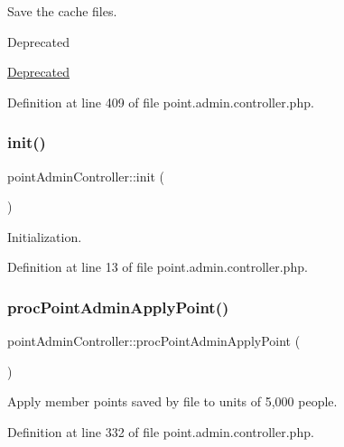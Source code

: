 Save the cache files. 

\begin{DoxyRefDesc}{Deprecated}
\item[\hyperlink{deprecated__deprecated000027}{Deprecated}]\end{DoxyRefDesc}


Definition at line 409 of file point.\+admin.\+controller.\+php.

\mbox{\label{classpointAdminController_a739b139aeeef70cf164f5e21dccec06a}} 
\subsubsection{\texorpdfstring{init()}{init()}}
{\footnotesize\ttfamily point\+Admin\+Controller\+::init (\begin{DoxyParamCaption}{ }\end{DoxyParamCaption})}



Initialization. 



Definition at line 13 of file point.\+admin.\+controller.\+php.

\mbox{\label{classpointAdminController_ade85d4289b954ca0c0caadafeb4c115c}} 
\subsubsection{\texorpdfstring{proc\+Point\+Admin\+Apply\+Point()}{procPointAdminApplyPoint()}}
{\footnotesize\ttfamily point\+Admin\+Controller\+::proc\+Point\+Admin\+Apply\+Point (\begin{DoxyParamCaption}{ }\end{DoxyParamCaption})}



Apply member points saved by file to units of 5,000 people. 



Definition at line 332 of file point.\+admin.\+controller.\+php.

